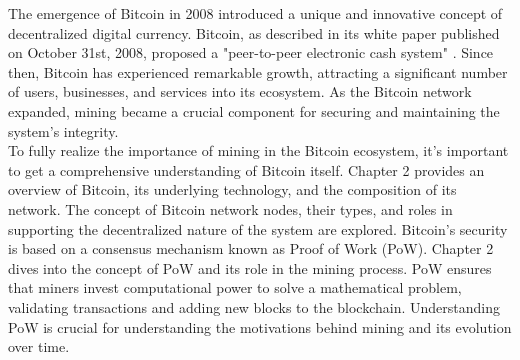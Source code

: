 \begin{comment}
Chapter 5 delves into Stratum V2, a significant upgrade to the Stratum protocol. We explore the motivations behind the development of Stratum V2 and its inner workings. This chapter highlights the differences between Stratum V1 and Stratum V2, emphasizing the enhanced security, transaction selection power, and other improvements introduced by the new protocol. Moreover, we examine the current implementations of Stratum V2, providing insights into its adoption within the mining community.\\
To facilitate a practical understanding and experimentation with Stratum V2, Chapter 6 introduces the Stratum Reference Implementation (SRI). We explain how SRI works, guide readers on getting started with it, and discuss potential future directions for research and development. Additionally, we explore concepts such as SRI Pool fallback, non-custodial pools, and the importance of a benchmarking suite for Stratum V2.\\
The research presented in this thesis aims to shed light on the profound significance of Stratum V2 as a transformative protocol within the domain of Bitcoin pooled mining. By examining the history, evolution, and current implementations of mining protocols, we provide a comprehensive understanding of the advancements made and their implications for the future. The concluding chapter reflects on the potential impact of Stratum V2 and introduces concepts like SV2 protocol benchmarking and non-custodial pools as promising pathways for future innovation and SV2 adoption.\\
Through this exploration, we hope to contribute to the ongoing development and evolution of Bitcoin mining practices, shaping the landscape of this critical component of the Bitcoin ecosystem in the years to come.
\end{comment}
The emergence of Bitcoin in 2008 introduced a unique and innovative concept of decentralized digital currency. Bitcoin, as described in its white paper published on October 31st, 2008, proposed a "peer-to-peer electronic cash system" \cite{nakamoto2008bitcoin}. Since then, Bitcoin has experienced remarkable growth, attracting a significant number of users, businesses, and services into its ecosystem. As the Bitcoin network expanded, mining became a crucial component for securing and maintaining the system's integrity.\\
To fully realize the importance of mining in the Bitcoin ecosystem, it's important to get a comprehensive understanding of Bitcoin itself. Chapter 2 provides an overview of Bitcoin, its underlying technology, and the composition of its network. The concept of Bitcoin network nodes, their types, and roles in supporting the decentralized nature of the system are explored. Bitcoin's security is based on a consensus mechanism known as Proof of Work (PoW). Chapter 2 dives into the concept of PoW and its role in the mining process. PoW ensures that miners invest computational power to solve a mathematical problem, validating transactions and adding new blocks to the blockchain. Understanding PoW is crucial for understanding the motivations behind mining and its evolution over time.\\
